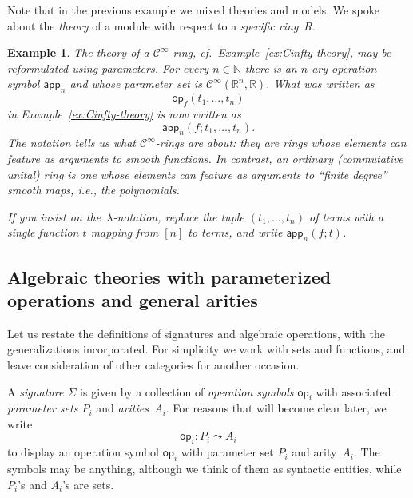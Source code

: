 \documentclass{amsart}
\newcommand{\NN}{\mathbb{N}} %
\newcommand{\RR}{\mathbb{R}} %
\newcommand{\op}[1]{\mathsf{op}_{#1}} %
\newcommand{\opdecl}[3]{#1 : #2 \leadsto #3} %
\newcommand{\Cinfty}{\mathcal{C}^\infty}
\newtheorem{example}[definition]{Example}
\begin{document}
Note that in the previous example we mixed theories and models. We spoke about
the \emph{theory} of a module with respect to a \emph{specific ring}~$R$.

\begin{example}
  The theory of a $\Cinfty$-ring, cf.\ Example~\ref{ex:Cinfty-theory}, may be
  reformulated using parameters. For every $n \in \NN$ there is an $n$-ary
  operation symbol $\mathsf{app}_n$ and whose parameter set is
  $\Cinfty(\RR^n, \RR)$. What was written as
  \begin{equation*}
    \op{f}(t_1, \ldots, t_n)
  \end{equation*}
  in Example~\ref{ex:Cinfty-theory} is now written as
  \begin{equation*}
    \mathsf{app}_n(f; t_1, \ldots, t_n).
  \end{equation*}
  The notation tells us what $\Cinfty$-rings are about: they are rings whose
  elements can feature as arguments to smooth functions. In contrast, an
  ordinary (commutative unital) ring is one whose elements can feature as
  arguments to ``finite degree'' smooth maps, i.e., the polynomials.

  If you insist on the~$\lambda$-notation, replace the tuple
  $(t_1, \ldots, t_n)$ of terms with a single function $t$ mapping from $[n]$ to
  terms, and write $\mathsf{app}_n(f; t)$.
\end{example}


\subsection{Algebraic theories with parameterized operations and general arities}
\label{sec:algebr-theor-with}

Let us restate the definitions of signatures and algebraic operations, with the
generalizations incorporated. For simplicity we work with sets and functions,
and leave consideration of other categories for another occasion.

A \emph{signature $\Sigma$} is given by a collection of \emph{operation symbols
  $\op{i}$} with associated \emph{parameter sets $P_i$} and
\emph{arities~$A_i$}. For reasons that will become clear later, we write
%
\begin{equation*}
  \opdecl{\op{i}}{P_i}{A_i}
\end{equation*}
%
to display an operation symbol $\op{i}$ with parameter set $P_i$ and
arity~$A_i$. The symbols may be anything, although we think of them as syntactic
entities, while $P_i$'s and $A_i$'s are sets.
\end{document}
